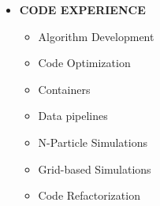 \documentclass[a4paper,12pt]{memoir} %
\begin{document}
\begin{itemize}[label={}, leftmargin=0pt]
  \MySep

  \item \large{\textbf{CODE EXPERIENCE}}
    \vspace*{-0.25cm}
    \normalsize{
      \begin{itemize}[label={}, leftmargin=0.5cm]
        \item Algorithm Development
        \item Code Optimization
        \item Containers
        \item Data pipelines
        \item N-Particle Simulations
        \item Grid-based Simulations
        \item Code Refactorization
      \end{itemize}
    }
\end{itemize}
\end{document}
